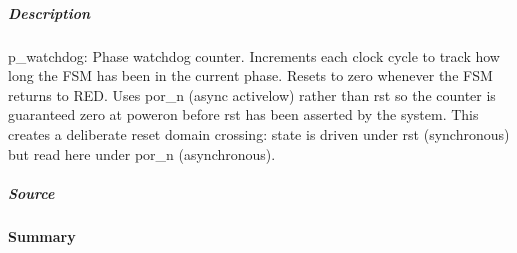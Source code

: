 \documentclass[letterpaper,10pt,english]{sphinxmanual}
\begin{document}
\subparagraph{Description}
\label{\detokenize{modules/traffic_light/processes/p_watchdog:description}}
\sphinxAtStartPar
p\_watchdog: Phase watchdog counter.
Increments each clock cycle to track how long the FSM has been in the
current phase. Resets to zero whenever the FSM returns to RED.
Uses por\_n (async active\sphinxhyphen{}low) rather than rst so the counter is
guaranteed zero at power\sphinxhyphen{}on before rst has been asserted by the system.
This creates a deliberate reset domain crossing: state is driven under
rst (synchronous) but read here under por\_n (asynchronous).


\subparagraph{Source}
\label{\detokenize{modules/traffic_light/processes/p_watchdog:source}}
\begin{sphinxVerbatim}[commandchars=\\\{\}]
\end{sphinxVerbatim}


\paragraph{Summary}
\label{\detokenize{modules/traffic_light/processes/index:summary}}
\end{document}
